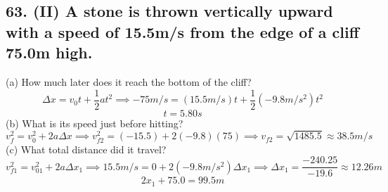 \documentclass[12pt,a4paper,english]{article}
\begin{document}
\begin{flushleft}
      \subsection{63. (II) A stone is thrown vertically upward with a speed of 15.5m/s from the edge of a cliff 75.0m high.}
      (a) How much later does it reach the bottom of the cliff?
      \[
        \Delta x=v_{0}t+\frac{1}{2}at^2 \implies
        -75m/s = (15.5m/s)t+\frac{1}{2}(-9.8m/s^2)t^2
      \]
      \[
        t=5.80s
      \]
      (b) What is its speed just before hitting?
      \[
        v_{f}^2=v_{0}^2+2a\Delta x \implies
        v_{f2}^2=(-15.5)+2(-9.8)(75) \implies
        v_{f2}=\sqrt{1485.5}\approx 38.5m/s
      \]
      (c) What total distance did it travel?
      \[
        v_{f1}^2=v_{01}^2+2a\Delta x_1\implies 
        15.5m/s=0+2(-9.8m/s^2)\Delta x_1\implies 
        \Delta x_1 = \frac{-240.25}{-19.6} \approx 12.26m
      \]
      \[
        2x_1+75.0=99.5m
      \]
\end{flushleft}
\end{document}
